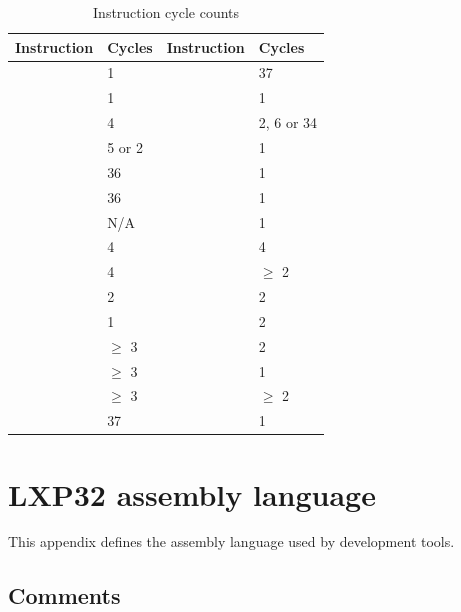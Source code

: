\documentclass[a4paper,12pt,twoside,extrafontsizes]{memoir}
\begin{document}
\begin{table}[htbp]
	\centering
	\caption{Instruction cycle counts}
	\label{tab:cycles}
	\begin{tabularx}{0.8\textwidth}{LLLL}
		\toprule
		Instruction & Cycles & Instruction & Cycles \\
		\midrule
		 & 1 &  & 37 \\
		 & 1 &  & 1 \\
		 & 4 &  & 2, 6 or 34\footnotemark[3] \\
		 & 5 or 2\footnotemark[1] &  & 1 \\
		 & 36 &  & 1 \\
		 & 36 &  & 1 \\
		 & N/A &  & 1 \\
		 & 4 &  & 4 \\
		 & 4 &  & $\ge$ 2\footnotemark[2] \\
		 & 2 &  & 2 \\
		 & 1 &  & 2 \\
		 & $\ge$ 3\footnotemark[2] &  & 2 \\
		 & $\ge$ 3\footnotemark[2] &  & 1 \\
		 & $\ge$ 3\footnotemark[2] &  & $\ge$ 2\footnotemark[2] \\
		 & 37 &  & 1 \\
		\bottomrule
	\end{tabularx}
\end{table}


\chapter{LXP32 assembly language}
\label{app:assemblylanguage}

This appendix defines the assembly language used by \lxp{} development tools.

\section{Comments}
\end{document}
